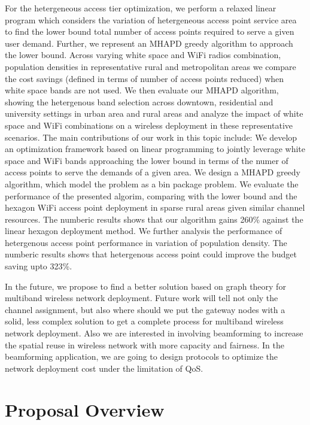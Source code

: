 For the hetergeneous access tier optimization, we perform a relaxed linear 
program which considers the variation of hetergeneous access point service 
area to find the lower bound total number of access points required to 
serve a given user demand. Further, we represent an MHAPD greedy algorithm 
to approach the lower bound. Across varying white space and WiFi radios 
combination, population densities in representative rural and metropolitan 
areas we compare the cost savings (defined in terms of number of access 
points reduced) when white space bands are not used. We then evaluate our 
MHAPD algorithm, showing the hetergenous band selection across downtown, 
residential and university settings in urban area and rural areas and analyze 
the impact of white space and WiFi combinations on a wireless deployment in 
these representative scenarios.
The main contributions of our work in this topic include: We develop an 
optimization framework based on linear programming to jointly leverage 
white space and WiFi bands approaching the lower bound in terms of the numer 
of access points to serve the demands of a given area. We design a MHAPD 
greedy algorithm, which model the problem as a bin package problem. We 
evaluate the performance of the presented algorim, comparing with the 
lower bound and the hexagon WiFi access point deployment in sparse rural 
areas given similar channel resources. The numberic results shows that our 
algorithm gains 260\% against the linear hexagon deployment method.  We 
further analysis the performance of hetergenous access point performance in 
variation of population density. The numberic results shows that hetergenous 
access point could improve the budget saving upto 323\%. 


In the future, we propose to find a better solution based on graph
theory for multiband wireless network deployment. Future work will
tell not only the channel assignment, but also where should we put
the gateway nodes with a solid, less complex solution to get a 
complete process for multiband wireless network deployment. Also 
we are interested in involving beamforming to increase the spatial
reuse in wireless network with more capacity and fairness. 
In the beamforming application, we are going to design protocols to 
optimize the network deployment cost under the limitation of QoS.



\section{Proposal Overview}

